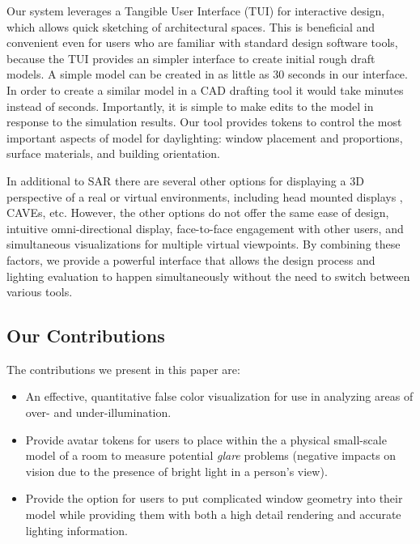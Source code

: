 \documentclass[10pt,twocolumn,letterpaper]{article}
\begin{document}

Our system leverages a Tangible User Interface (TUI) for interactive
design, which allows quick sketching of architectural spaces.  This is
beneficial and convenient even for users who are familiar with
standard design software tools, because the TUI provides an simpler
interface to create initial rough draft models.  A simple model can be
created in as little as 30 seconds in our interface.  In order to
create a similar model in a CAD drafting tool it would take minutes
instead of seconds.  Importantly, it is simple to make edits to the
model in response to the simulation results.  Our tool provides tokens
to control the most important aspects of model for daylighting: window
placement and proportions, surface materials, and building
orientation.


%
In additional to SAR there are several
other options for displaying a 3D perspective of a real or virtual
environments, including head
  mounted displays , CAVEs, etc.  However, the other options do not offer the same
ease of design, intuitive omni-directional display, 
 face-to-face engagement with other users,
and simultaneous visualizations for
 multiple virtual viewpoints.
%
By combining these factors, we provide a powerful interface that allows
the design process and lighting evaluation to happen simultaneously
without the need to switch between various tools.

\subsection {Our Contributions}

\noindent
The contributions we present in this paper are:
\vspace{-0.1in}

\begin{itemize}
\item An effective, quantitative false color visualization
  for use in analyzing areas of over- and under-illumination. \vspace{-0.1in}
\item Provide avatar tokens for users to place within the a
  physical small-scale model of a room to measure potential
  \emph{glare} problems (negative impacts on vision due to the
  presence of bright light in a person's view). \vspace{-0.1in}
\item Provide the option for users to put complicated window geometry
  into their model while providing them with both a high detail
  rendering and accurate lighting information.
\end{itemize}
\end{document}
